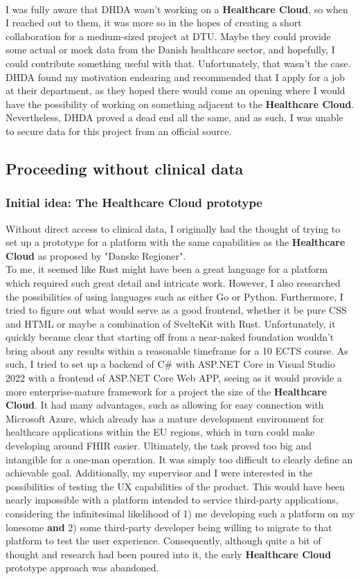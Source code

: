 \\
I was fully aware that DHDA wasn't working on a \textbf{Healthcare Cloud}, so when I reached out to them, it was more so in the hopes of creating a short collaboration for a medium-sized project at DTU. Maybe they could provide some actual or mock data from the Danish healthcare sector, and hopefully, I could contribute something useful with that. Unfortunately, that wasn't the case. DHDA found my motivation endearing and recommended that I apply for a job at their department, as they hoped there would come an opening where I would have the possibility of working on something adjacent to the \textbf{Healthcare Cloud}. Nevertheless, DHDA proved a dead end all the same, and as such, I was unable to secure data for this project from an official source.

\subsection{Proceeding without clinical data}
\subsubsection*{Initial idea: The Healthcare Cloud prototype}
Without direct access to clinical data, I originally had the thought of trying to set up a prototype for a platform with the same capabilities as the \textbf{Healthcare Cloud} as proposed by "Danske Regioner".
\\
To me, it seemed like Rust might have been a great language for a platform which required such great detail and intricate work. However, I also researched the possibilities of using languages such as either Go or Python. Furthermore, I tried to figure out what would serve as a good frontend, whether it be pure CSS and HTML or maybe a combination of SvelteKit with Rust. Unfortunately, it quickly became clear that starting off from a near-naked foundation wouldn't bring about any results within a reasonable timeframe for a 10 ECTS course. As such, I tried to set up a backend of C\# with ASP.NET Core in Visual Studio 2022 with a frontend of ASP.NET Core Web APP, seeing as it would provide a more enterprise-mature framework for a project the size of the \textbf{Healthcare Cloud}. It had many advantages, such as allowing for easy connection with Microsoft Azure, which already has a mature development environment for healthcare applications within the EU regions, which in turn could make developing around FHIR easier. Ultimately, the task proved too big and intangible for a one-man operation. It was simply too difficult to clearly define an achievable goal. Additionally, my supervisor and I were interested in the possibilities of testing the UX capabilities of the product. This would have been nearly impossible with a platform intended to service third-party applications, considering the infinitesimal likelihood of 1) me developing such a platform on my lonesome \textbf{and} 2) some third-party developer being willing to migrate to that platform to test the user experience. Consequently, although quite a bit of thought and research had been poured into it, the early \textbf{Healthcare Cloud} prototype approach was abandoned.


